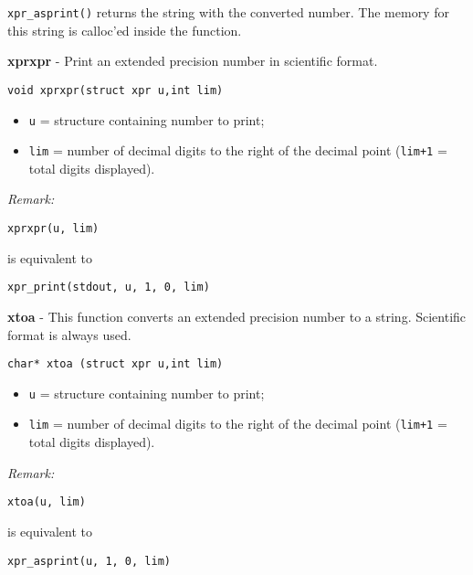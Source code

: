 \documentclass{article}
\begin{document}
\texttt{xpr\_asprint()} returns the string with the converted number.
The memory for this string is calloc'ed inside the function.


\hrulefill{}

\textbf{xprxpr} - Print an extended precision number in scientific format.

\begin{verbatim}
void xprxpr(struct xpr u,int lim)
\end{verbatim}

\begin{itemize}
\item \texttt{u}   = structure containing number to print;
\item \texttt{lim} = number of decimal digits to the right of the
decimal point (\texttt{lim+1} = total digits displayed).
\end{itemize}

\textit{Remark:}

\begin{verbatim}
xprxpr(u, lim)
\end{verbatim}

is equivalent to  

\begin{verbatim}
xpr_print(stdout, u, 1, 0, lim)
\end{verbatim}

\hrulefill{}

\textbf{xtoa} - This function converts an extended precision number to a 
string. Scientific format is always used.

\begin{verbatim}
char* xtoa (struct xpr u,int lim)
\end{verbatim}

\begin{itemize}
\item \texttt{u}   = structure containing number to print;
\item \texttt{lim} = number of decimal digits to the right of the
decimal point (\texttt{lim+1} = total digits displayed).
\end{itemize}

\textit{Remark:}

\begin{verbatim}
xtoa(u, lim)
\end{verbatim}

is equivalent to  

\begin{verbatim}
xpr_asprint(u, 1, 0, lim)
\end{verbatim}
\end{document}

